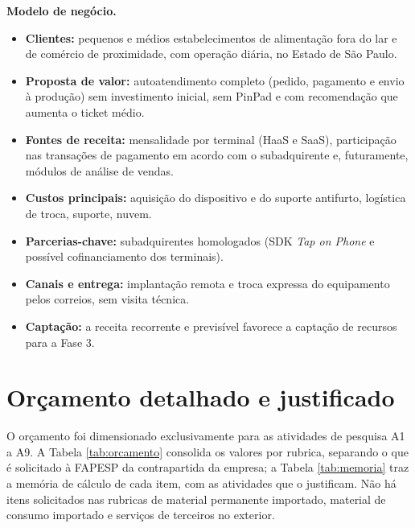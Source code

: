 \documentclass[12pt,a4paper]{article}
\begin{document}
\textbf{Modelo de negócio.}
\begin{itemize}
    \item \textbf{Clientes:} pequenos e médios estabelecimentos de alimentação fora do lar e de comércio de proximidade, com operação diária, no Estado de São Paulo.
    \item \textbf{Proposta de valor:} autoatendimento completo (pedido, pagamento e envio à produção) sem investimento inicial, sem PinPad e com recomendação que aumenta o ticket médio.
    \item \textbf{Fontes de receita:} mensalidade por terminal (HaaS e SaaS), participação nas transações de pagamento em acordo com o subadquirente e, futuramente, módulos de análise de vendas.
    \item \textbf{Custos principais:} aquisição do dispositivo e do suporte antifurto, logística de troca, suporte, nuvem.
    \item \textbf{Parcerias-chave:} subadquirentes homologados (SDK \textit{Tap on Phone} e possível cofinanciamento dos terminais).
    \item \textbf{Canais e entrega:} implantação remota e troca expressa do equipamento pelos correios, sem visita técnica.
    \item \textbf{Captação:} a receita recorrente e previsível favorece a captação de recursos para a Fase 3.
\end{itemize}

\section{Orçamento detalhado e justificado}

O orçamento foi dimensionado exclusivamente para as atividades de pesquisa A1 a A9. A Tabela \ref{tab:orcamento} consolida os valores por rubrica, separando o que é solicitado à FAPESP da contrapartida da empresa; a Tabela \ref{tab:memoria} traz a memória de cálculo de cada item, com as atividades que o justificam. Não há itens solicitados nas rubricas de material permanente importado, material de consumo importado e serviços de terceiros no exterior.
\end{document}
